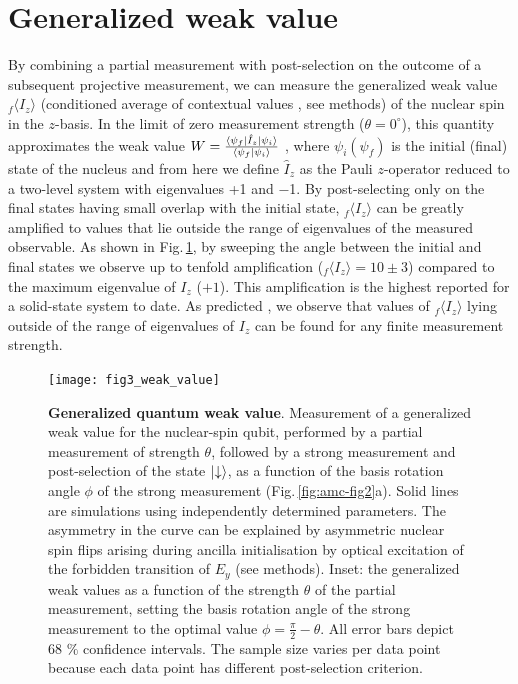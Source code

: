 \section{Generalized weak value}
By combining a partial measurement with post-selection on the outcome of a subsequent projective measurement, we can measure the generalized weak value $_{f} \langle I_{z} \rangle$ (conditioned average of contextual values \cite{Dressel_PRL_2010}, see methods) of the nuclear spin in the $z$-basis. In the limit of zero measurement strength ($\theta = 0^{\circ}$), this quantity approximates the weak value \cite{Aharonov_PRL_1988} $W = \frac{\left<\psi_f\right| \hat{I}_z \left|\psi_i\right>}{\left<\psi_f\right| \psi_i \rangle}$ , where $ \psi_i (\psi_f )$ is the initial (final) state of the nucleus and from here we define $\hat{I}_z$ as the Pauli $z$-operator reduced to a two-level system with eigenvalues +1 and $-$1. By post-selecting only on the final states having small overlap with the initial state, $_{f} \langle I_{z} \rangle$ can be greatly amplified to values that lie outside the range of eigenvalues of the measured observable. As shown in Fig.\,\ref{fig:amc-fig3}, by sweeping the angle between the initial and final states we observe up to tenfold amplification ($_{f} \langle I_{z} \rangle = 10 \pm 3$) compared to the maximum eigenvalue of $I_{z}$ ($+1$). This amplification is the highest reported for a solid-state system to date\cite{Groen_PRL_2013}. As predicted \cite{Williams_PRL_2008}, we observe that values of  $_{f} \langle I_{z} \rangle$ lying outside of the range of eigenvalues of $I_{z}$ can be found for any finite measurement strength.

\begin{figure}
	\centering
	\texttt{[image: fig3\_weak\_value]}
	\caption{\label{fig:amc-fig3} \textbf{Generalized quantum weak value}. Measurement of a generalized weak value for the nuclear-spin qubit, performed by a partial measurement of strength $\theta$, followed by a strong measurement and post-selection of the state  $\left|\downarrow\right>$, as a function of the basis rotation angle $\phi$ of the strong measurement (Fig.\,\ref{fig:amc-fig2}a). Solid lines are simulations using independently determined parameters. The asymmetry in the curve can be explained by asymmetric nuclear spin flips arising during ancilla initialisation by optical excitation of the forbidden transition of $E_{y}$ (see methods). Inset: the generalized weak values as a function of the strength $\theta$ of the partial measurement, setting the basis rotation angle of the strong measurement to the optimal value  $\phi = \frac{\pi}{2} - \theta$. All error bars depict 68 $\%$ confidence intervals. The sample size varies per data point because each data point has different post-selection criterion.}
\end{figure}

